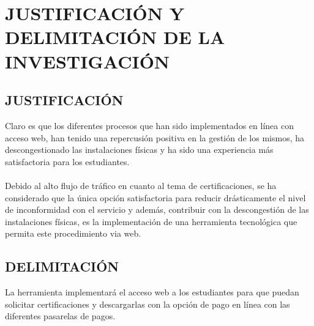 \chapter{JUSTIFICACI\'ON Y DELIMITACI\'ON DE LA INVESTIGACI\'ON}
\section{JUSTIFICACI\'ON}
%
Claro es que los diferentes procesos que han sido implementados en l\'inea con acceso web, han tenido una repercusi\'on positiva en la gesti\'on de los mismos, ha descongestionado las instalaciones f\'isicas y ha sido una experiencia m\'as satisfactoria para los estudiantes.\\%
%
\\Debido al alto flujo de tr\'afico en cuanto al tema de certificaciones, se ha considerado que la \'unica opci\'on satisfactoria para reducir dr\'asticamente el nivel de inconformidad con el servicio y adem\'as, contribuir con la descongesti\'on de las instalaciones f\'isicas, es la implementaci\'on de una herramienta tecnol\'ogica que permita este procedimiento via web.%
%
\section{DELIMITACI\'ON}
%
La herramienta implementar\'a el acceso web a los estudiantes para que puedan solicitar certificaciones y descargarlas con la opci\'on de pago en l\'inea con las diferentes pasarelas de pagos.%